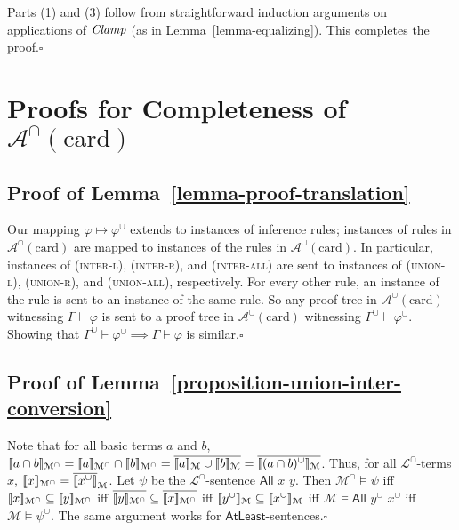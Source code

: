 \documentclass[letterpaper]{article} %
\theoremstyle{definition}
\newcommand{\semantics}[1]{[\![\mbox{\em $ #1 $\/}]\!]}
\newcommand{\Model}{\mathcal{M}}
\newcommand{\proves}{\vdash}
\newcommand{\lang}{\mathcal{L}}
\renewcommand{\phi}{\varphi}
\newcommand{\Aunion}{\mathscr{A}^{\cup}}
\newcommand{\Ainter}{\mathscr{A}^{\cap}}
\newcommand{\proverule}{\textsc}
\newcommand{\unionl}{\proverule{union-l}}
\newcommand{\unionr}{\proverule{union-r}}
\newcommand{\unionall}{\proverule{union-all}}
\newcommand{\interl}{\proverule{inter-l}}
\newcommand{\interr}{\proverule{inter-r}}
\newcommand{\interall}{\proverule{inter-all}}
\newcommand{\All}[2]{\mathsf{All}\,\,#1\,\,#2}
\newcommand{\AtleastNoArgs}{\mathsf{AtLeast}}
\newcommand{\card}{\mathrm{card}}
\newcommand{\Clamp}{\protect{\mbox{\textit{Clamp}}}}
\begin{document}
Parts (1) and (3) follow from straightforward induction arguments on applications of $\Clamp$ (as in Lemma~\ref{lemma-equalizing}).
This completes the proof.\hfill$\square$



\section{Proofs for Completeness of $\Ainter(\card)$}
\label{s:supp:completeness-Aintercard}

\subsection*{Proof of Lemma~\ref{lemma-proof-translation}}

Our mapping $\phi\mapsto\phi^\cup$ extends to instances of inference rules; instances of rules in $\Ainter(\card)$ are mapped to instances of the rules in $\Aunion(\card)$. 
In particular, instances of (\interl), (\interr), and (\interall) are sent to instances of (\unionl), (\unionr), and (\unionall), respectively.  For every other rule, an instance of the rule is sent to an instance of the same rule.  So any proof tree in $\Aunion(\card)$ witnessing $\Gamma \proves \varphi$ is sent to a proof tree in $\Aunion(\card)$ witnessing $\Gamma^\cup \proves \varphi^\cup$.  Showing that $\Gamma^\cup \proves \varphi^\cup \implies \Gamma \proves \varphi$ is similar.\hfill$\square$


\subsection*{Proof of Lemma~\ref{proposition-union-inter-conversion}}

Note that for all basic terms $a$ and $b$, 
$\semantics{a\cap b}_{\Model^\cap} =\semantics{a}_{\Model^\cap}
\cap \semantics{b}_{\Model^\cap}
=  \overline{\semantics{a}_{\Model}
\cup \semantics{b}_{\Model}  }
=  \overline{\semantics{(a\cap b)^{\cup}}_{\Model}  }
$.
Thus, for all $\lang^\cap$-terms $x$, 
$\semantics{x}_{\Model^\cap} = \overline{\semantics{x^\cup}}_{\Model}$.
Let $\psi$ be the $\lang^\cap$-sentence $\All{x}{y}$.
Then 
$\Model^\cap \models \psi$
iff
$\semantics{x}_{\Model^\cap} \subseteq \semantics{y}_{\Model^\cap}$
iff
$\overline{\semantics{y}_{\Model^\cap}} \subseteq \overline{\semantics{x}_{\Model^\cap}}$
iff
$\semantics{y^\cup}_\Model \subseteq \semantics{x^\cup}_\Model$
iff
$\Model\models\All{y^\cup}{x^\cup}$
iff
$\Model\models\psi^\cup$.
The same argument works for $\AtleastNoArgs$-sentences.\hfill$\square$
\end{document}
